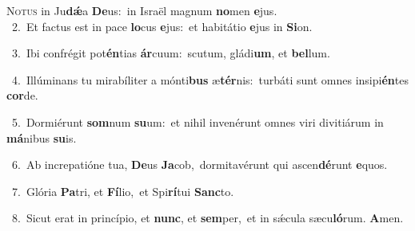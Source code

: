 \lettrine{\initial\textcolor{\initialcolor}{N}}{otus} in Ju\-\textbf{dǽ}\-a \textbf{De}\-us:~\star in Israël magnum \textbf{no}\-men \textbf{e}\-jus.\\
{\numbfont\textcolor{\numbcolor}{~2.}}~Et factus est in pace \textbf{lo}\-cus \textbf{e}\-jus:~\star et habitátio \textbf{e}\-jus in \textbf{Si}\-on.\par
{\numbfont\textcolor{\numbcolor}{~3.}}~Ibi confrégit pot\-\textbf{én}\-tias \textbf{ár}\-cuum:~\star scutum, gládi\-\textbf{um}\-, et \textbf{bel}\-lum.\par
{\numbfont\textcolor{\numbcolor}{~4.}}~Illúminans tu mirabíliter a mónti\textbf{bus} æ\-\textbf{tér}\-nis:~\star turbáti sunt omnes insipi\-\textbf{én}\-tes \textbf{cor}\-de.\par
{\numbfont\textcolor{\numbcolor}{~5.}}~Dormiérunt \textbf{som}\-num \textbf{su}\-um:~\star et nihil invenérunt omnes viri divitiárum in \textbf{má}\-nibus \textbf{su}\-is.\par
{\numbfont\textcolor{\numbcolor}{~6.}}~Ab increpatióne tua, \textbf{De}\-us \textbf{Ja}\-cob,~\star dormitavérunt qui ascen\-\textbf{dé}\-runt \textbf{e}\-quos.\par
{\numbfont\textcolor{\numbcolor}{~7.}}~Glória \textbf{Pa}\-tri, et \textbf{Fí}\-lio,~\star et Spi\-\textbf{rí}\-tui \textbf{Sanc}\-to.\par
{\numbfont\textcolor{\numbcolor}{~8.}}~Sicut erat in princípio, et \textbf{nunc}\-, et \textbf{sem}\-per,~\star et in sǽcula sæcu\-\textbf{ló}\-rum. \textbf{A}\-men.\par
